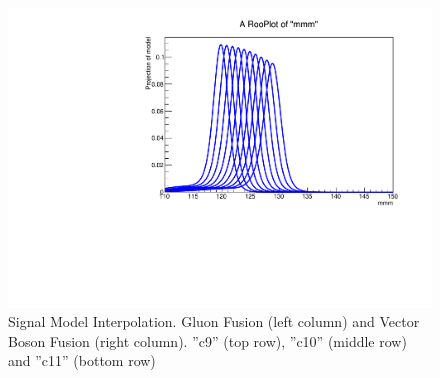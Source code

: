 \begin{figure}[hbp]
  \includegraphics[width=0.49\linewidth]{figures/signal_model/AppendixBdt/interpolation_VBF_cat11.pdf}
  \caption{Signal Model Interpolation. Gluon Fusion (left column) and Vector Boson Fusion (right column). ''c9'' (top row), ''c10'' (middle row) and ''c11'' (bottom row)}
  \label{fig:higgs_signalmodel_gluvbfc9c11}
\end{figure}




